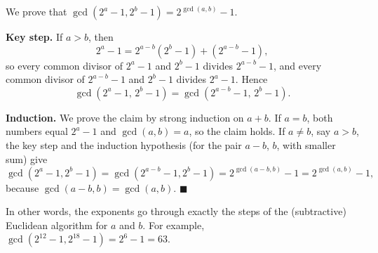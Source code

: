 We prove that $\gcd\left(2^a-1,2^b-1\right)=\boxed{2^{\gcd(a,b)}-1}$.

\textbf{Key step.} If $a>b$, then
\[
2^a-1=2^{a-b}\left(2^b-1\right)+\left(2^{a-b}-1\right),
\]
so every common divisor of $2^a-1$ and $2^b-1$ divides $2^{a-b}-1$, and every common divisor of $2^{a-b}-1$ and $2^b-1$ divides $2^a-1$. Hence
\[
\gcd\left(2^a-1,\,2^b-1\right)=\gcd\left(2^{a-b}-1,\,2^b-1\right).
\]

\textbf{Induction.} We prove the claim by strong induction on $a+b$. If $a=b$, both numbers equal $2^a-1$ and $\gcd(a,b)=a$, so the claim holds. If $a\ne b$, say $a>b$, the key step and the induction hypothesis (for the pair $a-b$, $b$, with smaller sum) give
\[
\gcd\left(2^a-1,2^b-1\right)=\gcd\left(2^{a-b}-1,2^b-1\right)=2^{\gcd(a-b,b)}-1=2^{\gcd(a,b)}-1,
\]
because $\gcd(a-b,b)=\gcd(a,b)$. $\blacksquare$

In other words, the exponents go through exactly the steps of the (subtractive) Euclidean algorithm for $a$ and $b$. For example, $\gcd\left(2^{12}-1,2^{18}-1\right)=2^6-1=63$.
